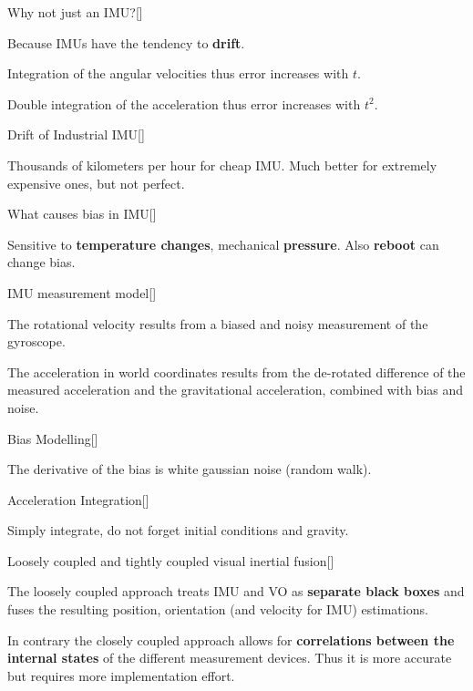 \documentclass[10pt,a4paper]{scrartcl}
\begin{document}
\begin{multicols*}{2}
\begin{QandA}{Why not just an IMU?}[\Application]
\item Because IMUs have the tendency to \textbf{drift}.
\item Integration of the angular velocities thus error increases with $t$.
\item Double integration of the acceleration thus error increases with $t^2$.
\end{QandA}

\begin{QandA}
{Drift of Industrial IMU}[\Application]
\item Thousands of kilometers per hour for cheap IMU. Much better for extremely expensive ones, but not perfect.
\end{QandA}

\begin{QandA}
{What causes bias in IMU}[\Application]
\item Sensitive to \textbf{temperature changes}, mechanical \textbf{pressure}. Also \textbf{reboot} can change bias.
\end{QandA}

\begin{QandA}
{IMU measurement model}[\Definition]
\item The rotational velocity results from a biased and noisy measurement of the gyroscope.
\item The acceleration in world coordinates results from the de-rotated difference of the measured acceleration and the gravitational acceleration, combined with bias and noise.
\end{QandA}

\begin{QandA}
{Bias Modelling}[\Application]
\item The derivative of the bias is white gaussian noise (random walk).
\end{QandA}

\begin{QandA}
{Acceleration Integration}[\Application]
\item Simply integrate, do not forget initial conditions and gravity.
\end{QandA}

\begin{QandA}
{Loosely coupled and tightly coupled visual inertial fusion}[\Definition]
\item The loosely coupled approach treats IMU and VO as \textbf{separate black boxes} and fuses the resulting position, orientation (and velocity for IMU) estimations.
\item In contrary the closely coupled approach allows for \textbf{correlations between the internal states} of the different measurement devices. Thus it is more accurate but requires more implementation effort.
\end{QandA}


\end{multicols*}
\end{document}
